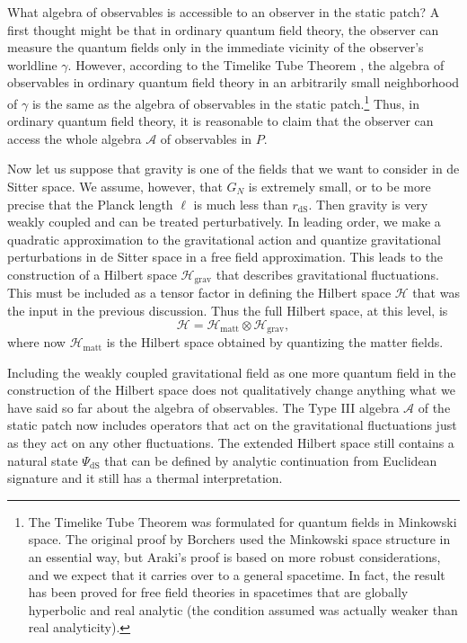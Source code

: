 \documentclass[11pt,a4paper]{article}
\def\be{\begin{equation}}
\def\ee{\end{equation}}
\def\A{{\mathcal A}}
\def\H{{\mathcal H}}
\def\grav{{\mathrm{grav}}}
\def\dS{{\mathrm{dS}}}
\def\matt{{\mathrm{matt}}}
\begin{document}
  What algebra of observables is accessible to an observer in the static patch?
A first thought might be that in ordinary quantum field theory, the observer can measure the quantum fields only in the immediate vicinity of the observer's 
worldline $\gamma$.    However, according to the Timelike Tube Theorem  \cite{Borchers,ArakiTwo}, the algebra of observables in ordinary quantum field theory in an
arbitrarily small
neighborhood of $\gamma$ is the same as the algebra of observables in the static patch.\footnote{The Timelike Tube Theorem was formulated for quantum fields
in Minkowski space.   The original proof by Borchers \cite{Borchers} used the Minkowski space structure in an essential way, but Araki's proof \cite{ArakiTwo} is based on
more robust considerations, and we expect that it carries over to a general spacetime.  In fact, the result has been proved for free field theories in spacetimes that are globally hyperbolic and real analytic \cite{Strohmaier} (the condition assumed was actually weaker than real analyticity).}   Thus, in ordinary quantum field theory, it is reasonable to claim that the observer
can access the whole algebra $\A$ of observables in $P$.

Now let us suppose that gravity is one of the fields that we want to consider in de Sitter space.   We assume, however, that $G_N$ is extremely
small, or to be more precise that the Planck length $\ell$ is much less than $r_\dS$.   Then gravity is very weakly
coupled and can be treated perturbatively.    In leading order, we make a quadratic approximation to the gravitational action and quantize gravitational perturbations
in de Sitter space in a free field approximation.   This leads to the construction of a Hilbert space $\H_\grav$ that describes gravitational fluctuations.   This must
be included as a tensor factor in defining the Hilbert space $\H$ that was the input in the previous discussion.  Thus the full Hilbert space, at this level, is
\be\label{xombo} \H=\H_{\mathrm{matt}}\otimes \H_{\mathrm{grav}} ,\ee
where now $\H_\matt$ is the Hilbert space obtained by quantizing the matter fields.



Including the weakly coupled gravitational field as one more quantum field in the construction of the Hilbert space does not qualitatively change anything what
we have said so far about the algebra of observables.    
The Type III algebra $\A$ of the static patch now  includes operators that act on the gravitational fluctuations just as they act on
any other fluctuations.     The extended Hilbert space still contains a natural state $\Psi_\dS$ that can be defined by analytic continuation from Euclidean signature
and it still has a thermal interpretation.
\end{document}
